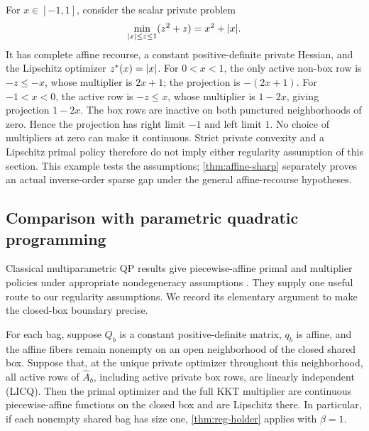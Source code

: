 \begin{example}
\label{ex:strict-convex-insufficient}
For $x\in[-1,1]$, consider the scalar private problem
\[
 \min_{\lvert x\rvert\le z\le1}(z^2+z)=x^2+\lvert x\rvert.
\]
It has complete affine recourse, a constant positive-definite private
Hessian, and the Lipschitz optimizer $z^*(x)=\lvert x\rvert$. For $0<x<1$,
the only active non-box row is $-z\le-x$, whose multiplier is $2x+1$;
the projection is $-(2x+1)$. For $-1<x<0$, the active row is $-z\le x$,
whose multiplier is $1-2x$, giving projection $1-2x$. The box rows are
inactive on both punctured neighborhoods of zero. Hence the projection
has right limit $-1$ and left limit $1$. No choice of multipliers at zero
can make it continuous. Strict private convexity and a Lipschitz primal
policy therefore do not imply either regularity assumption of this
section. This example tests the assumptions; \cref{thm:affine-sharp}
separately proves an actual inverse-order sparse gap under the general
affine-recourse hypotheses.
\end{example}

\subsection{Comparison with parametric quadratic programming}
\label{sec:reg-parametric}

Classical multiparametric QP results give piecewise-affine primal and
multiplier policies under appropriate nondegeneracy assumptions
\cite{tondel2003-an-algorithm-for-multi-parametric,baotic2016-gradient-value-function}.
They supply one useful route to our regularity assumptions. We record
its elementary argument to make the closed-box boundary precise.

\begin{proposition}\label{prop:reg-qp}
For each bag, suppose $Q_b$ is a constant positive-definite matrix,
$q_b$ is affine, and the affine fibers remain nonempty on an open
neighborhood of the closed shared box. Suppose that, at the unique
private optimizer throughout this neighborhood, all active rows of
$\widehat A_b$, including active private box rows, are linearly independent
(LICQ). Then the primal optimizer and the full KKT multiplier are
continuous piecewise-affine functions on the closed box and are
Lipschitz there. In particular, if each nonempty shared bag has size one,
\cref{thm:reg-holder} applies with $\beta=1$.
\end{proposition}

